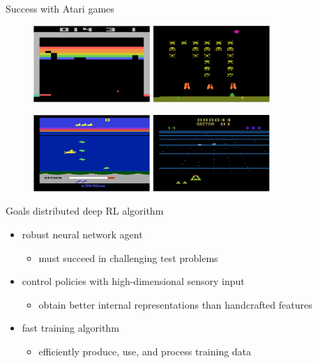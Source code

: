 \begin{frame}{Success with Atari games}
    \begin{figure}
        \centering
        \includegraphics[width=0.8\textwidth]{atari-ex1.png}
    \end{figure}
    \begin{figure}
        \centering
        \includegraphics[width=0.8\textwidth]{atari-ex2.png}
    \end{figure}
\end{frame}

\begin{frame}{Goals}
    distributed deep RL algorithm
    \vspace*{0.5em}
    \begin{itemize}\itemsep=12pt
        
        \item robust neural network agent
        \vspace*{0.5em}
        \begin{itemize}
            \item must succeed in challenging test problems
        \end{itemize}

        \item control policies with high-dimensional sensory input
        \vspace*{0.5em}
        \begin{itemize}
            \item obtain better internal representations than handcrafted features
        \end{itemize}

        \item fast training algorithm
        \vspace*{0.5em}
        \begin{itemize}
            \item efficiently produce, use, and process training data
        \end{itemize}

    \end{itemize}
\end{frame}

